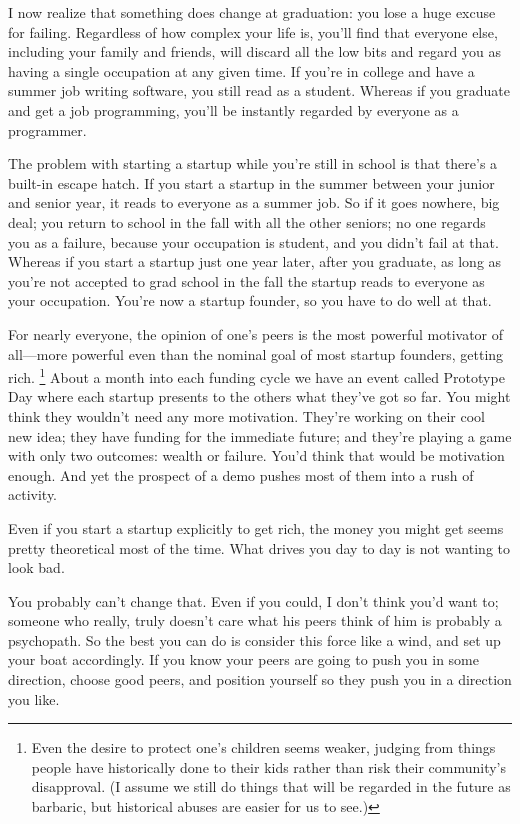 \documentclass[12pt]{book}
\begin{document}
I now realize that something does change at graduation: you lose a huge
excuse for failing. Regardless of how complex your life is, you'll find
that everyone else, including your family and friends, will discard all
the low bits and regard you as having a single occupation at any given
time. If you're in college and have a summer job writing software, you
still read as a student. Whereas if you graduate and get a job
programming, you'll be instantly regarded by everyone as a programmer.

The problem with starting a startup while you're still in school is that
there's a built-in escape hatch. If you start a startup in the summer
between your junior and senior year, it reads to everyone as a summer
job. So if it goes nowhere, big deal; you return to school in the fall
with all the other seniors; no one regards you as a failure, because
your occupation is student, and you didn't fail at that. Whereas if you
start a startup just one year later, after you graduate, as long as
you're not accepted to grad school in the fall the startup reads to
everyone as your occupation. You're now a startup founder, so you have
to do well at that.

For nearly everyone, the opinion of one's peers is the most powerful
motivator of all---more powerful even than the nominal goal of most
startup founders, getting rich. \footnote{Even the desire to protect one's children seems weaker, judging
from things people have historically done to their kids rather than risk
their community's disapproval. (I assume we still do things that will be
regarded in the future as barbaric, but historical abuses are easier for
us to see.)} About a month
into each funding cycle we have an event called Prototype Day where each
startup presents to the others what they've got so far. You might think
they wouldn't need any more motivation. They're working on their cool
new idea; they have funding for the immediate future; and they're
playing a game with only two outcomes: wealth or failure. You'd think
that would be motivation enough. And yet the prospect of a demo pushes
most of them into a rush of activity.

Even if you start a startup explicitly to get rich, the money you might
get seems pretty theoretical most of the time. What drives you day to
day is not wanting to look bad.

You probably can't change that. Even if you could, I don't think you'd
want to; someone who really, truly doesn't care what his peers think of
him is probably a psychopath. So the best you can do is consider this
force like a wind, and set up your boat accordingly. If you know your
peers are going to push you in some direction, choose good peers, and
position yourself so they push you in a direction you like.
\end{document}
